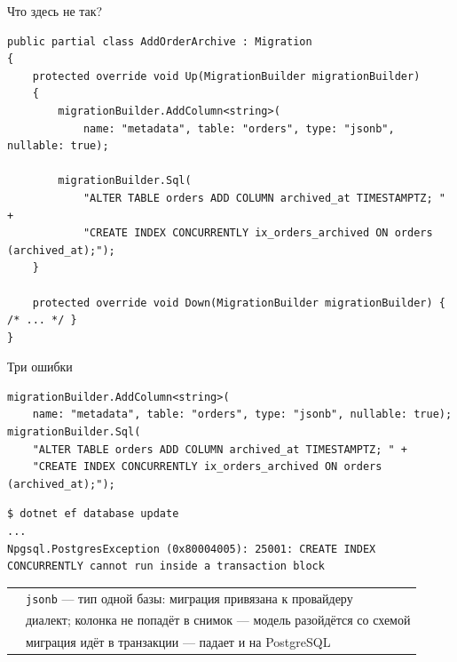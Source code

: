\documentclass[aspectratio=169,10pt,t]{beamer}
\newcommand{\codesm}{\ttfamily\fontsize{7.6}{9.0}\selectfont}
\newcommand{\codexs}{\ttfamily\fontsize{7.0}{8.3}\selectfont}
\newcommand{\termsm}{\ttfamily\fontsize{6.6}{7.9}\selectfont}
\begin{document}
\begin{frame}[fragile]{Что здесь не так?}
  \slidetop
\begin{lstlisting}[style=csharp,basicstyle=\codesm]
public partial class AddOrderArchive : Migration
{
    protected override void Up(MigrationBuilder migrationBuilder)
    {
        migrationBuilder.AddColumn<string>(
            name: "metadata", table: "orders", type: "jsonb", nullable: true);

        migrationBuilder.Sql(
            "ALTER TABLE orders ADD COLUMN archived_at TIMESTAMPTZ; " +
            "CREATE INDEX CONCURRENTLY ix_orders_archived ON orders (archived_at);");
    }

    protected override void Down(MigrationBuilder migrationBuilder) { /* ... */ }
}
\end{lstlisting}
\end{frame}

\begin{frame}[fragile]{Три ошибки}
  \vspace{0.3em}
\begin{lstlisting}[style=csharp,basicstyle=\codexs]
migrationBuilder.AddColumn<string>(
    name: "metadata", table: "orders", type: "jsonb", nullable: true);
migrationBuilder.Sql(
    "ALTER TABLE orders ADD COLUMN archived_at TIMESTAMPTZ; " +
    "CREATE INDEX CONCURRENTLY ix_orders_archived ON orders (archived_at);");
\end{lstlisting}

\begin{lstlisting}[style=term,basicstyle=\termsm,breaklines=true,breakatwhitespace=true,breakindent=4em]
$ dotnet ef database update
...
Npgsql.PostgresException (0x80004005): 25001: CREATE INDEX CONCURRENTLY cannot run inside a transaction block
\end{lstlisting}

  {\renewcommand{\arraystretch}{1.3}
  \begin{tabular}{@{}L{3.2cm}L{9.6cm}@{}}
     & \texttt{jsonb} --- тип одной базы: миграция
      привязана к провайдеру \\
       & диалект; колонка не попадёт в снимок --- модель
      разойдётся со схемой \\
      & миграция идёт в транзакции --- падает и на
      PostgreSQL \\
  \end{tabular}}
\end{frame}
\end{document}

